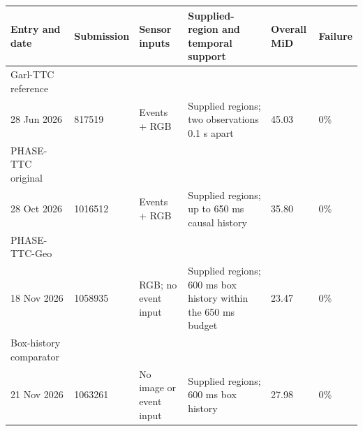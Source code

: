 \begin{tabularx}{\linewidth}{@{}p{.17\linewidth}p{.12\linewidth}p{.17\linewidth}Xp{.085\linewidth}p{.07\linewidth}@{}}
\toprule
Entry and date & Submission & Sensor inputs & Supplied-region and temporal support & Overall MiD & Failure \\
\midrule
Garl-TTC reference\\28 Jun 2026 & 817519 & Events + RGB & Supplied regions; two observations 0.1 s apart & 45.03 & 0\% \\
PHASE-TTC original\\28 Oct 2026 & 1016512 & Events + RGB & Supplied regions; up to 650 ms causal history & 35.80 & 0\% \\
PHASE-TTC-Geo\\18 Nov 2026 & 1058935 & RGB; no event input & Supplied regions; 600 ms box history within the 650 ms budget & 23.47 & 0\% \\
Box-history comparator\\21 Nov 2026 & 1063261 & No image or event input & Supplied regions; 600 ms box history & 27.98 & 0\% \\
\bottomrule
\end{tabularx}
